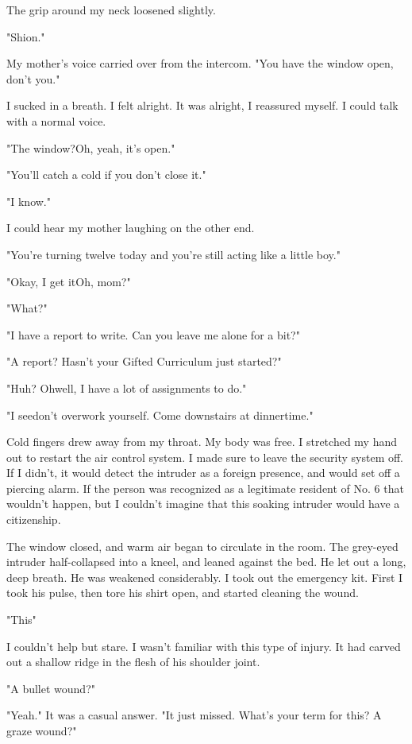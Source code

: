 The grip around my neck loosened slightly.

"Shion."

My mother's voice carried over from the intercom. "You have the window
open, don't you."

I sucked in a breath. I felt alright. It was alright, I reassured
myself. I could talk with a normal voice.

"The window?\el Oh, yeah, it's open."

"You'll catch a cold if you don't close it."

"I know."

I could hear my mother laughing on the other end.

"You're turning twelve today and you're still acting like a little boy."

"Okay, I get it\el Oh, mom?"

"What?"

"I have a report to write. Can you leave me alone for a bit?"

"A report? Hasn't your Gifted Curriculum just started?"

"Huh? Oh\el well, I have a lot of assignments to do."

"I see\el don't overwork yourself. Come downstairs at dinnertime."

Cold fingers drew away from my throat. My body was free. I stretched my
hand out to restart the air control system. I made sure to leave the
security system off. If I didn't, it would detect the intruder as a
foreign presence, and would set off a piercing alarm. If the person was
recognized as a legitimate resident of No. 6 that wouldn't happen, but I
couldn't imagine that this soaking intruder would have a citizenship.

The window closed, and warm air began to circulate in the room. The
grey-eyed intruder half-collapsed into a kneel, and leaned against the
bed. He let out a long, deep breath. He was weakened considerably. I
took out the emergency kit. First I took his pulse, then tore his shirt
open, and started cleaning the wound.

"This\el "

I couldn't help but stare. I wasn't familiar with this type of injury.
It had carved out a shallow ridge in the flesh of his shoulder joint.

"A bullet wound?"

"Yeah." It was a casual answer. "It just missed. What's your term for
this? A graze wound?"

